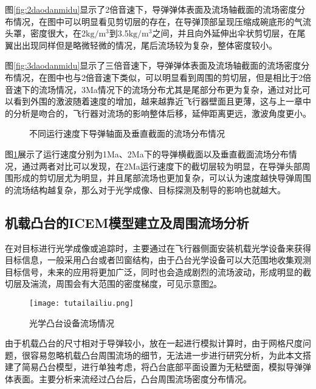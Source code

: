图\ref{fig:2daodanmidu}显示了2倍音速下，导弹弹体表面及流场轴截面的流场密度分布情况，在图中可以明显看见剪切层的存在，在导弹顶部呈现压缩成碗底形的气流头罩，密度很大，在2$\text{kg}/\text{m}^3$到3.5$\text{kg}/\text{m}^3$之间，并且向外延伸出伞状剪切层，在尾翼出出现同样但是略微轻微的情况，尾后流场较为复杂，整体密度较小。

图\ref{fig:3daodanmidu}显示了三倍音速下，导弹弹体表面及流场轴截面的流场密度分布情况，在图中也与2倍音速下类似，可以明显看到周围的剪切层，但是相比于2倍音速下的流场情况，3Ma情况下的流场分布尤其是尾部分布更为复杂，通过对比可以看到外围的激波随着速度的增加，越来越靠近飞行器壁面且更薄，这与上一章中的分析是吻合的，飞行器对流场的影响整体后移，延伸距离更远，激波角度更小。

\begin{figure}[bhtp]
\centering
{}
\caption{不同运行速度下导弹轴面及垂直截面的流场分布情况}
\label{fig:daodanceshi}
\end{figure}

图\ref{fig:daodanceshi}展示了运行速度分别为1Ma、2Ma下的导弹横截面以及垂直截面流场分布情况，通过两者对比可以发现，在2Ma运行速度下的截切层较为明显，在导弹头部周围形成的剪切层尤为明显，并且尾部流场也更加复杂，可以认为速度越快导弹周围的流场结构越复杂，那么对于光学成像、目标探测及制导的影响也就越大。

\subsection{机载凸台的ICEM模型建立及周围流场分析}
在对目标进行光学成像或追踪时，主要通过在飞行器侧面安装机载光学设备来获得目标信息，一般采用凸台或者凹窗结构，由于凸台光学设备可以大范围地收集观测目标信号，未来的应用将更加广泛，同时也会造成剧烈的流场波动，形成明显的截切层及湍流，周围会有大范围的密度梯度，可见示意图\ref{fig:tutailailiu}。
\begin{figure}[bthp]
\centering
\texttt{[image: tutailailiu.png]}
\caption{光学凸台设备流场情况}
\label{fig:tutailailiu}
\end{figure}

由于机载凸台的尺寸相对于导弹较小，放在一起进行模拟计算时，由于网格尺度问题，很容易忽略机载凸台周围流场的细节，无法进一步进行研究分析，为此本文搭建了简易凸台模型，进行单独考虑，将凸台底部平面设置为无粘壁面，模拟导弹弹体表面。主要分析来流经过凸台后，凸台周围流场密度分布情况。

